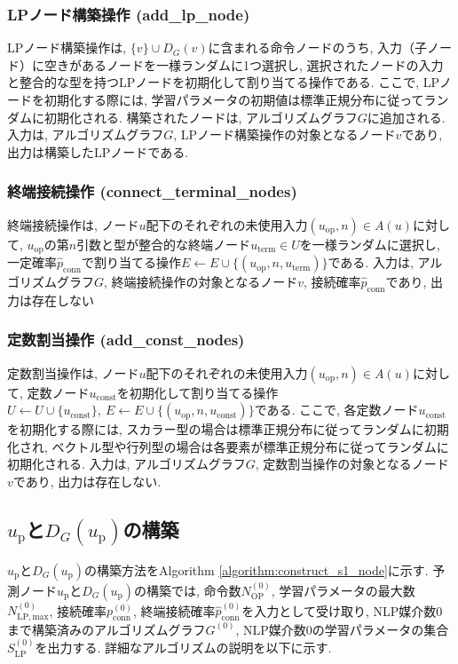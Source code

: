 \documentclass[11pt,oneside,openany,report]{jsbook}
\begin{document}
\subsubsection{LPノード構築操作 (add\_lp\_node)}
LPノード構築操作は, $\{v\} \cup D_G(v)$に含まれる命令ノードのうち, 入力（子ノード）に空きがあるノードを一様ランダムに1つ選択し, 選択されたノードの入力と整合的な型を持つLPノードを初期化して割り当てる操作である. ここで, LPノードを初期化する際には, 学習パラメータの初期値は標準正規分布に従ってランダムに初期化される. 構築されたノードは, アルゴリズムグラフ$G$に追加される. 入力は, アルゴリズムグラフ$G$, LPノード構築操作の対象となるノード$v$であり, 出力は構築したLPノードである.

\subsubsection{終端接続操作 (connect\_terminal\_nodes)}
終端接続操作は, ノード$u$配下のそれぞれの未使用入力$(u_\mathrm{op},n) \in A(u)$に対して, $u_\mathrm{op}$の第$n$引数と型が整合的な終端ノード$u_\mathrm{term} \in U$を一様ランダムに選択し, 一定確率$\hat{p}_\mathrm{conn}$で割り当てる操作$E \leftarrow E \cup \{ (u_\mathrm{op}, n, u_\mathrm{term}) \} $である. 入力は, アルゴリズムグラフ$G$, 終端接続操作の対象となるノード$v$, 接続確率$\hat{p}_\mathrm{conn}$であり, 出力は存在しない

\subsubsection{定数割当操作 (add\_const\_nodes)}
定数割当操作は, ノード$u$配下のそれぞれの未使用入力$(u_\mathrm{op},n) \in A(u)$に対して, 定数ノード$u_\mathrm{const}$を初期化して割り当てる操作$U \leftarrow U \cup \{u_\mathrm{const}\},\ E \leftarrow E \cup \{ (u_\mathrm{op}, n, u_\mathrm{const}) \} $である. ここで, 各定数ノード$u_\mathrm{const}$を初期化する際には, スカラー型の場合は標準正規分布に従ってランダムに初期化され, ベクトル型や行列型の場合は各要素が標準正規分布に従ってランダムに初期化される. 入力は, アルゴリズムグラフ$G$, 定数割当操作の対象となるノード$v$であり, 出力は存在しない.

\subsection{$u_\mathrm{p}$と$D_G(u_\mathrm{p})$の構築} \label{subsec:proposed:initialization:s1}

$u_\mathrm{p}$と$D_G(u_\mathrm{p})$の構築方法をAlgorithm \ref{algorithm:construct_s1_node}に示す. 予測ノード$u_\mathrm{p}$と$D_G(u_\mathrm{p})$の構築では, 命令数$N_{\mathrm{OP}}^{(0)}$, 学習パラメータの最大数$N_{\mathrm{LP}, \mathrm{max}}^{(0)}$, 接続確率$p^{(0)}_\mathrm{conn}$, 終端接続確率$\hat{p}^{(0)}_\mathrm{conn}$を入力として受け取り, NLP媒介数0まで構築済みのアルゴリズムグラフ$G^{(0)}$, NLP媒介数0の学習パラメータの集合$S_\mathrm{LP}^{(0)}$を出力する. 詳細なアルゴリズムの説明を以下に示す.
\end{document}
